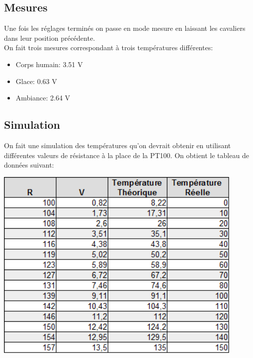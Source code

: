 \documentclass[a4paper,12pt]{article}
\begin{document}
    \subsection{Mesures}
      \par Une fois les réglages terminés on passe en mode mesure en laissant les cavaliers dans leur position précédente.\\
      On fait trois mesures correspondant à trois températures différentes:
      \begin{itemize}
        \item Corps humain: 3.51 V
        \item Glace: 0.63 V
        \item Ambiance: 2.64 V
      \end{itemize}

    \subsection{Simulation}
      \par On fait une simulation des températures qu'on devrait obtenir en utilisant différentes valeurs de résistance à la place de la PT100.
			On obtient le tableau de données suivant:
			\begin{center}
				\includegraphics[width=12cm]{../Images/TabPT100.png}
			\end{center}
\end{document}
